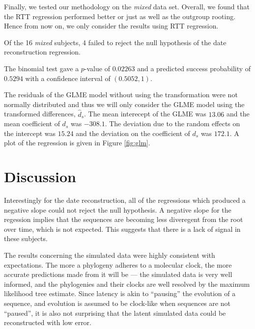 \documentclass[12pt]{article}
\begin{document}


Finally, we tested our methodology on the {\em mixed} data set. Overall, we found that the RTT regression performed better or just as well as the outgroup rooting. Hence from now on, we only consider the results using RTT regression.

Of the 16 \emph{mixed} subjects, 4 failed to reject the null hypothesis of the date reconstruction regression.

The {binomial test} gave a $p$-value of $0.02263$ and a predicted success probability of $0.5294$ with a confidence interval of $(0.5052, 1)$.

The residuals of the {GLME model} without using the transformation were not normally distributed and thus we will only consider the GLME model using the transformed differences, $\hat{d}_s$. The mean interecept of the GLME was $13.06$ and the mean coefficient of $d_s$ was $-308.1$. The deviation due to the random effects on the intercept was $15.24$ and the deviation on the coefficient of $d_s$ was $172.1$. A plot of the regression is given in Figure \ref{fig:glm}.

\section * {Discussion} \label{sec:discuss}
Interestingly for the date reconstruction, all of the regressions which produced a negative slope could not reject the null hypothesis. A negative slope for the regession implies that the sequences are becoming less diveregent from the root over time, which is not expected. This suggests that there is a lack of signal in these subjects.


The results concerning the simulated data were highly consistent with expectations. 
The more a phylogeny adheres to a molecular clock, the more accurate predictions made from it will be --- the simulated data is very well informed, and the phylogenies and their clocks are well resolved by the maximum likelihood tree estimate. 
Since latency is akin to ``pausing'' the evolution of a sequence, and evolution is assumed to be clock-like when sequences are not ``paused'', it is also not surprising that the latent simulated data could be reconstructed with low error. 
\end{document}
